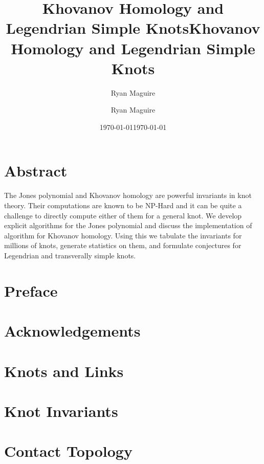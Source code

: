 \documentclass{dcthesis}
\title{Khovanov Homology and Legendrian Simple Knots}
\author{Ryan Maguire}
\date{\today}
\title{Khovanov Homology and Legendrian Simple Knots}
\author{Ryan Maguire}
\date{\today}
\theoremstyle{plain}
\theoremstyle{normal}
\begin{document}
    \frontmatter
    \maketitle
    \chapter*{Abstract}
        The Jones polynomial and Khovanov homology are powerful invariants
        in knot theory. Their computations are known to be NP-Hard and it
        can be quite a challenge to directly compute either of them for a
        general knot. We develop explicit algorithms for the Jones polynomial
        and discuss the implementation of algorithm for Khovanov homology.
        Using this we tabulate the invariants for millions of knots, generate
        statistics on them, and formulate conjectures for Legendrian and
        transverally simple knots.
    \chapter*{Preface}
        
    \chapter*{Acknowledgements}
        
    \tableofcontents
    \listoftables
    \listoffigures
    \mainmatter
    \chapter{Knots and Links}
        
        
        
        
    \chapter{Knot Invariants}
        
        
        
        
        
    \chapter{Contact Topology}
        
        
        
        
\end{document}
